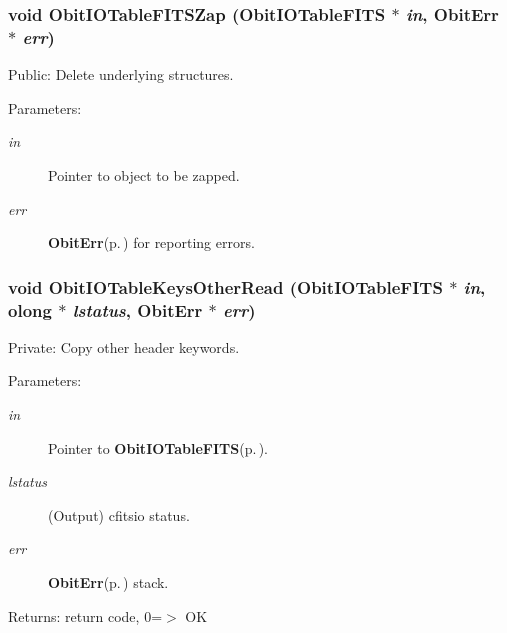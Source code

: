 \subsubsection{\setlength{\rightskip}{0pt plus 5cm}void Obit\-IOTable\-FITSZap ({\bf Obit\-IOTable\-FITS} $\ast$ {\em in}, {\bf Obit\-Err} $\ast$ {\em err})}\label{ObitIOTableFITS_8c_a15}


Public: Delete underlying structures. 

\begin{Desc}
\item[Parameters:]
\begin{description}
\item[{\em in}]Pointer to object to be zapped. \item[{\em err}]{\bf Obit\-Err}{\rm (p.\,\pageref{structObitErr})} for reporting errors. \end{description}
\end{Desc}
\subsubsection{\setlength{\rightskip}{0pt plus 5cm}void Obit\-IOTable\-Keys\-Other\-Read ({\bf Obit\-IOTable\-FITS} $\ast$ {\em in}, {\bf olong} $\ast$ {\em lstatus}, {\bf Obit\-Err} $\ast$ {\em err})}\label{ObitIOTableFITS_8c_a7}


Private: Copy other header keywords. 

\begin{Desc}
\item[Parameters:]
\begin{description}
\item[{\em in}]Pointer to {\bf Obit\-IOTable\-FITS}{\rm (p.\,\pageref{structObitIOTableFITS})}. \item[{\em lstatus}](Output) cfitsio status. \item[{\em err}]{\bf Obit\-Err}{\rm (p.\,\pageref{structObitErr})} stack. \end{description}
\end{Desc}
\begin{Desc}
\item[Returns:]return code, 0=$>$ OK \end{Desc}
